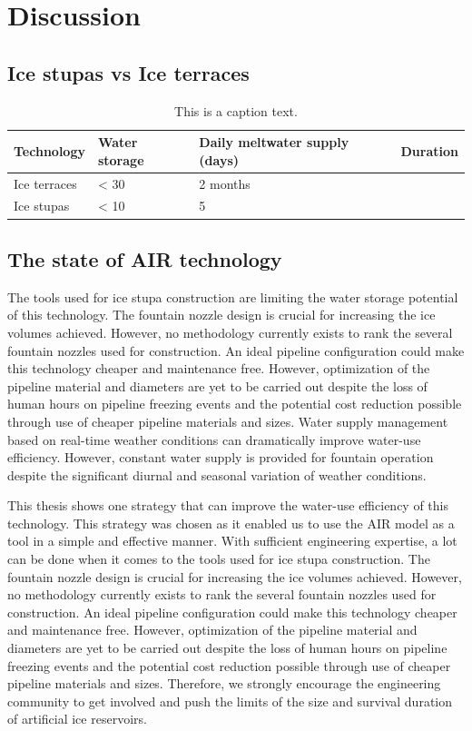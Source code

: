 \section{Discussion}

\subsection{Ice stupas vs Ice terraces}

\begin{table}[htb]
	\begin{tabularx}{\textwidth}{X | X | X | X}
		\hline
    \textbf{Technology}& \textbf{Water storage}& \textbf{Daily meltwater supply (days)}& \textbf{Duration} \\
    \hline
		Ice terraces			& < 30				     & 2 months				\\
    Ice stupas        & < 10             & 5				\\
		\hline
	\end{tabularx}
	\label{tab:table1}
	\caption{This is a caption text.}
\end{table}


\subsection{The state of AIR technology}

The tools used for ice stupa construction are limiting the water storage potential of this technology. The
fountain nozzle design is crucial for increasing the ice volumes achieved. However, no methodology currently
exists to rank the several fountain nozzles used for construction. An ideal pipeline configuration could make
this technology cheaper and maintenance free. However, optimization of the pipeline material and diameters are
yet to be carried out despite the loss of human hours on pipeline freezing events and the potential cost
reduction possible through use of cheaper pipeline materials and sizes. Water supply management based on
real-time weather conditions can dramatically improve water-use efficiency. However, constant water supply is
provided for fountain operation despite the significant diurnal and seasonal variation of weather conditions.

This thesis shows one strategy that can improve the water-use efficiency of this technology. This strategy was
chosen as it enabled us to use the AIR model as a tool in a simple and effective manner. With sufficient
engineering expertise, a lot can be done when it comes to the tools used for ice stupa construction. The
fountain nozzle design is crucial for increasing the ice volumes achieved. However, no methodology currently
exists to rank the several fountain nozzles used for construction. An ideal pipeline configuration could make
this technology cheaper and maintenance free. However, optimization of the pipeline material and diameters are
yet to be carried out despite the loss of human hours on pipeline freezing events and the potential cost
reduction possible through use of cheaper pipeline materials and sizes. Therefore, we strongly encourage the
engineering community to get involved and push the limits of the size and survival duration of artificial ice
reservoirs. 

